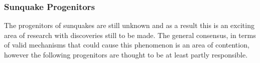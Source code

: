 \subsubsection{Sunquake Progenitors}\label{sunprog}


The progenitors of sunquakes are still unknown and as a result this is an exciting area of research with discoveries still to be made. The general consensus, in terms of valid mechanisms that could cause this phenomenon is an area of contention, however the following progenitors are thought to be at least partly responsible. \\

